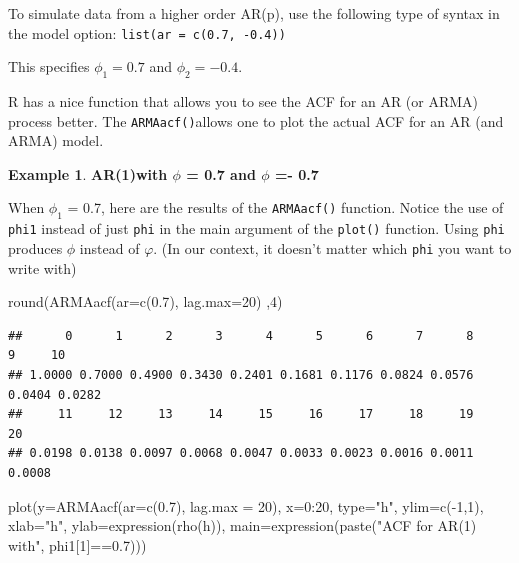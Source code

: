 \documentclass[
]{book}
\newenvironment{Shaded}{\begin{snugshade}}{\end{snugshade}}
\newcommand{\AttributeTok}[1]{\textcolor[rgb]{0.77,0.63,0.00}{#1}}
\newcommand{\DecValTok}[1]{\textcolor[rgb]{0.00,0.00,0.81}{#1}}
\newcommand{\FloatTok}[1]{\textcolor[rgb]{0.00,0.00,0.81}{#1}}
\newcommand{\FunctionTok}[1]{\textcolor[rgb]{0.00,0.00,0.00}{#1}}
\newcommand{\NormalTok}[1]{#1}
\newcommand{\SpecialCharTok}[1]{\textcolor[rgb]{0.00,0.00,0.00}{#1}}
\newcommand{\StringTok}[1]{\textcolor[rgb]{0.31,0.60,0.02}{#1}}
\theoremstyle{definition}
\theoremstyle{definition}
\newtheorem{example}{Example}[chapter]
\theoremstyle{definition}
\theoremstyle{definition}
\theoremstyle{remark}
\begin{document}
To simulate data from a higher order AR(p), use the following type of syntax in the model option: \texttt{list(ar\ =\ c(0.7,\ -0.4))}

This specifies \(\phi_1 = 0.7\) and \(\phi_2 = -0.4\).

R has a nice function that allows you to see the ACF for an AR (or ARMA) process better. The \texttt{ARMAacf()}allows one to plot the actual ACF for an AR (and ARMA) model.

\begin{example}
\textbf{AR(1)with \(\phi\) = 0.7 and \(\phi\) =- 0.7}

When \(\phi_1\) = 0.7, here are the results of the \texttt{ARMAacf()} function. Notice the use of \texttt{phi1} instead of just \texttt{phi} in the main argument of the \texttt{plot()} function. Using \texttt{phi} produces \(\phi\) instead of \(\varphi\). (In our context, it doesn't matter which \texttt{phi} you want to write with)

\begin{Shaded}
\begin{Highlighting}[]
\FunctionTok{round}\NormalTok{(}\FunctionTok{ARMAacf}\NormalTok{(}\AttributeTok{ar=}\FunctionTok{c}\NormalTok{(}\FloatTok{0.7}\NormalTok{), }\AttributeTok{lag.max=}\DecValTok{20}\NormalTok{) ,}\DecValTok{4}\NormalTok{)}
\end{Highlighting}
\end{Shaded}

\begin{verbatim}
##      0      1      2      3      4      5      6      7      8      9     10 
## 1.0000 0.7000 0.4900 0.3430 0.2401 0.1681 0.1176 0.0824 0.0576 0.0404 0.0282 
##     11     12     13     14     15     16     17     18     19     20 
## 0.0198 0.0138 0.0097 0.0068 0.0047 0.0033 0.0023 0.0016 0.0011 0.0008
\end{verbatim}

\begin{Shaded}
\begin{Highlighting}[]
\FunctionTok{plot}\NormalTok{(}\AttributeTok{y=}\FunctionTok{ARMAacf}\NormalTok{(}\AttributeTok{ar=}\FunctionTok{c}\NormalTok{(}\FloatTok{0.7}\NormalTok{), }\AttributeTok{lag.max =} \DecValTok{20}\NormalTok{), }\AttributeTok{x=}\DecValTok{0}\SpecialCharTok{:}\DecValTok{20}\NormalTok{, }\AttributeTok{type=}\StringTok{"h"}\NormalTok{, }\AttributeTok{ylim=}\FunctionTok{c}\NormalTok{(}\SpecialCharTok{{-}}\DecValTok{1}\NormalTok{,}\DecValTok{1}\NormalTok{), }\AttributeTok{xlab=}\StringTok{"h"}\NormalTok{, }\AttributeTok{ylab=}\FunctionTok{expression}\NormalTok{(}\FunctionTok{rho}\NormalTok{(h)), }\AttributeTok{main=}\FunctionTok{expression}\NormalTok{(}\FunctionTok{paste}\NormalTok{(}\StringTok{"ACF for AR(1) with"}\NormalTok{, phi1[}\DecValTok{1}\NormalTok{]}\SpecialCharTok{==}\FloatTok{0.7}\NormalTok{)))}


\end{Highlighting}
\end{Shaded}
\end{example}
\end{document}

